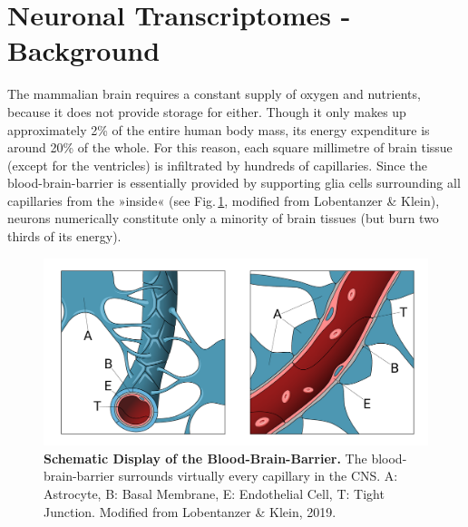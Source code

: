 \section{Neuronal Transcriptomes - Background}
The mammalian brain requires a constant supply of oxygen and nutrients, because it does not provide storage for either. Though it only makes up approximately 2\% of the entire human body mass, its energy expenditure is around 20\% of the whole.\cite{Raichle2002} For this reason, each square millimetre of brain tissue (except for the ventricles) is infiltrated by hundreds of capillaries.\cite{Bohn2016} Since the blood-brain-barrier is essentially provided by supporting glia cells surrounding all capillaries from the »inside« (see Fig.\,\ref{fig:bbb}, modified from Lobentanzer \& Klein\cite{Lobentanzer2019b}), neurons numerically constitute only a minority of brain tissues (but burn two thirds of its energy).

\begin{figure}
\includegraphics[width=\textwidth]{figures/bbb}
\caption[Schematic Display of the Blood-Brain-Barrier.]{\textbf{Schematic Display of the Blood-Brain-Barrier.} The blood-brain-barrier surrounds virtually every capillary in the CNS. A: Astrocyte, B: Basal Membrane, E: Endothelial Cell, T: Tight Junction. Modified from Lobentanzer \& Klein, 2019.\cite{Lobentanzer2019b}
\label{fig:bbb}}
\end{figure}

